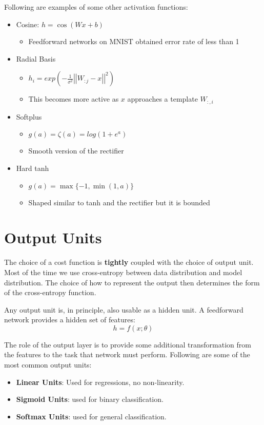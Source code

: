 Following are examples of some other activation functions:
\begin{itemize}
	\item Cosine: $h = \cos(Wx+b)$
	      \begin{itemize}
		      \item Feedforward networks on MNIST obtained error rate of less than 1%
	      \end{itemize}
	\item Radial Basis
	      \begin{itemize}
		      \item $h_{i} = exp(- \frac{1}{\sigma^{2}} \left| \left| W_{:j}-x \right| \right|^{2})$
		      \item This becomes more active as $x$ approaches a template $W_{:,i}$
	      \end{itemize}
	\item Softplus
	      \begin{itemize}
		      \item $g(a) = \zeta(a) = log(1+e^{a})$
		      \item Smooth version of the rectifier
	      \end{itemize}
	\item Hard tanh
	      \begin{itemize}
		      \item $g(a) = \max\{-1, \min(1,a)\}$
		      \item Shaped similar to tanh and the rectifier but it is bounded
	      \end{itemize}
\end{itemize}

\section{Output Units}%
\label{sec:label}

The choice of a cost function is \textbf{tightly} coupled with the choice of output unit. Most of the time we use cross-entropy between data distribution and model distribution. The choice of how to represent the output then determines the form of the cross-entropy function.

Any output unit is, in principle, also usable as a hidden unit. A feedforward network provides a hidden set of features:
\[
	h = f(x;\theta)
\]

The role of the output layer is to provide some additional transformation from the features to the task that
network must perform. Following are some of the most common output units:
\begin{itemize}
	\item \textbf{Linear Units}: Used for regressions, no non-linearity.
	\item \textbf{Sigmoid Units}: used for binary classification.
	\item \textbf{Softmax Units}: used for general classification.
\end{itemize}

